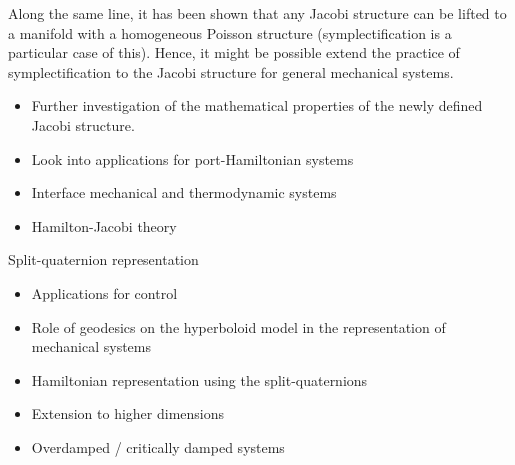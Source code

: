 Along the same line, it has been shown that any Jacobi structure can be lifted to a manifold with a homogeneous Poisson structure (symplectification is a particular case of this). Hence, it might be possible extend the practice of symplectification to the Jacobi structure for general mechanical systems. 

\begin{itemize}
    \item Further investigation of the mathematical properties of the newly defined Jacobi structure.
    \item Look into applications for port-Hamiltonian systems
    \item Interface mechanical and thermodynamic systems
    \item Hamilton-Jacobi theory
\end{itemize}

Split-quaternion representation
\begin{itemize}
    \item Applications for control
    \item Role of geodesics on the hyperboloid model in the representation of mechanical systems
    \item Hamiltonian representation using the split-quaternions
    \item Extension to higher dimensions
    \item Overdamped / critically damped systems
\end{itemize}

